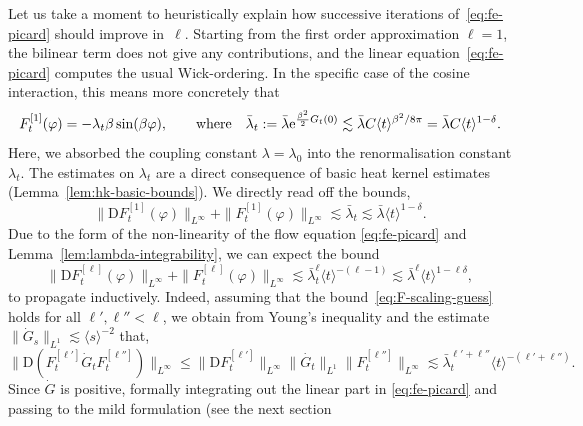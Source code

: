 \documentclass[11pt, a4paper]{scrartcl}
\numberwithin{equation}{section}
\theoremstyle{plain}
\theoremstyle{remark}
\newcommand{\assign}{:=}
\newcommand{\mathD}{\mathrm{D}}
\newcommand{\mathe}{\mathrm{e}}
\begin{document}
Let us take a moment to heuristically explain how successive iterations
of~\eqref{eq:fe-picard} should improve in~$\ell$. Starting from the first
order approximation $\ell = 1$, the bilinear term does not give any
contributions, and the linear equation~\eqref{eq:fe-picard} computes the usual
Wick-ordering. In the specific case of the cosine interaction, this means more
concretely that
\begin{equation}
	F^{[1]}_t (\varphi) = - \lambda_t \beta \sin (\beta \varphi)
	\label{eq:F1-explicit}, \qquad \text{where\quad} \bar{\lambda}_t \assign \bar{\lambda}
	\mathe^{\frac{\beta^2}{2} G_t (0)} \lesssim \bar{\lambda} C \langle t
	\rangle^{\beta^2 / 8 \pi} = \bar{\lambda} C \langle t \rangle^{1 - \delta} .
\end{equation}
Here, we absorbed the coupling constant $\lambda = \lambda_0$ into the
renormalisation constant $\lambda_t$. The estimates on $\lambda_t$ are a
direct consequence of basic heat kernel estimates
(Lemma~\ref{lem:hk-basic-bounds}). We directly read off the bounds,
\begin{equation}
	\| \mathD F_t^{[1]} (\varphi) \|_{L^{\infty}} + \| F_t^{[1]} (\varphi)
	\|_{L^{\infty}} \lesssim \bar{\lambda}_t \lesssim \bar{\lambda} \langle t \rangle^{1 -
		\delta} . \label{eq:F1-scaling}
\end{equation}
Due to the form of the non-linearity of the flow equation \eqref{eq:fe-picard}
and Lemma~\ref{lem:lambda-integrability}, we can expect the bound
\begin{equation}
	\| \mathD F^{[\ell]}_t (\varphi) \|_{L^{\infty}} + \| F^{[\ell]}_t (\varphi)
	\|_{L^{\infty}} \lesssim \bar{\lambda}_t^{\ell} \langle t \rangle^{- (\ell - 1)}
	\lesssim \bar{\lambda}^{\ell} \langle t \rangle^{1 - \ell \delta},
	\label{eq:F-scaling-guess}
\end{equation}
to propagate inductively. Indeed, assuming that the
bound~\eqref{eq:F-scaling-guess} holds for all $\ell', \ell'' < \ell$, we
obtain from Young's inequality and the estimate $\| \dot{G}_s \|_{L^1}
	\lesssim \langle s \rangle^{- 2}$ that,
\begin{equation}
	\| \mathD (F_t^{[\ell']}  \dot{G}_t F^{[\ell'']}_t) \|_{L^{\infty}}
	\leqslant \| \mathD F_t^{[\ell']} \|_{L^{\infty}} \| \dot{G_t} \|_{L^1} \|
	F_t^{[\ell'']} \|_{L^{\infty}} \lesssim \bar{\lambda}_t^{\ell' + \ell''} \langle t
	\rangle^{- (\ell' + \ell'')} \label{eq:DFGF-young} .
\end{equation}
Since $\dot{G}$ is positive, formally integrating out the linear part in
\eqref{eq:fe-picard} and passing to the mild formulation (see the next section
\end{document}
